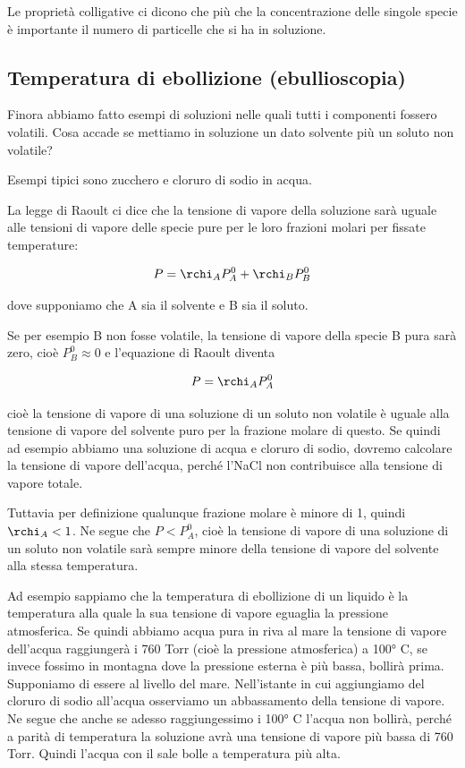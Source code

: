 Le proprietà colligative ci dicono che più che la concentrazione delle singole specie è importante il numero di particelle che si ha in soluzione.
\subsection{Temperatura di ebollizione (ebullioscopia)}
Finora abbiamo fatto esempi di soluzioni nelle quali tutti i componenti fossero volatili. Cosa accade se mettiamo in soluzione un dato solvente più un soluto non volatile?

Esempi tipici sono zucchero e cloruro di sodio in acqua.

La legge di Raoult ci dice che la tensione di vapore della soluzione sarà uguale alle tensioni di vapore delle specie pure per le loro frazioni molari per fissate temperature:

$$P=\rchi_AP^0_A + \rchi_BP^0_B$$

dove supponiamo che A sia il solvente e B sia il soluto.

Se per esempio B non fosse volatile, la tensione di vapore della specie B pura sarà zero, cioè $P_B^0 \approx 0$ e l'equazione di Raoult diventa

$$P=\rchi_A P_A^0$$

cioè la tensione di vapore di una soluzione di un soluto non volatile è uguale alla tensione di vapore del solvente puro per la frazione molare di questo. Se quindi ad esempio abbiamo una soluzione di acqua e cloruro di sodio, dovremo calcolare la tensione di vapore dell'acqua, perché l'NaCl non contribuisce alla tensione di vapore totale.

Tuttavia per definizione qualunque frazione molare è minore di 1, quindi $\rchi_A<1$. Ne segue che $P < P_A^0$, cioè la tensione di vapore di una soluzione di un soluto non volatile sarà sempre minore della tensione di vapore del solvente alla stessa temperatura.

Ad esempio sappiamo che la temperatura di ebollizione di un liquido è la temperatura alla quale la sua tensione di vapore eguaglia la pressione atmosferica. Se quindi abbiamo acqua pura in riva al mare la tensione di vapore dell'acqua raggiungerà i 760 Torr (cioè la pressione atmosferica) a 100° C, se invece fossimo in montagna dove la pressione esterna è più bassa, bollirà prima. Supponiamo di essere al livello del mare. Nell'istante in cui aggiungiamo del cloruro di sodio all'acqua osserviamo un abbassamento della tensione di vapore. Ne segue che anche se adesso raggiungessimo i 100° C l'acqua non bollirà, perché a parità di temperatura la soluzione avrà una tensione di vapore più bassa di 760 Torr. Quindi l'acqua con il sale bolle a temperatura più alta.

